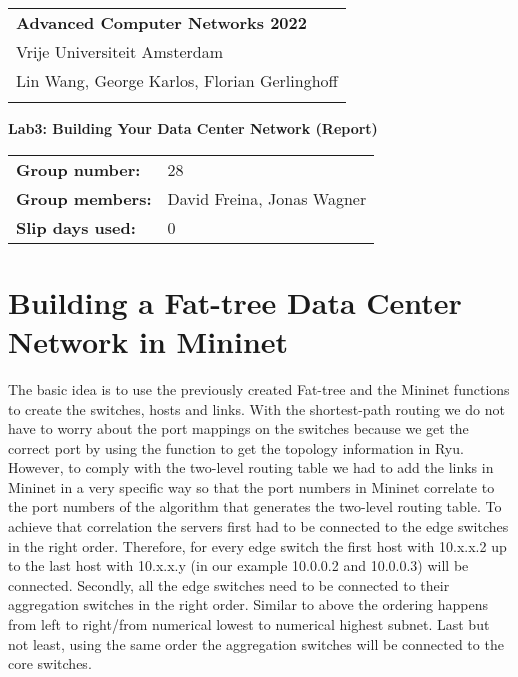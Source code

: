 \documentclass[a4paper,11pt]{article}
\newcommand{\note}[1]{\textit{\textcolor{gray}{#1}}}
\begin{document}
\thispagestyle{empty}

\begin{tabular}{@{}p{15.5cm}}
{\bf Advanced Computer Networks 2022} \\
Vrije Universiteit Amsterdam  \\ Lin Wang, George Karlos, Florian Gerlinghoff\\
\hline
\\
\end{tabular}

\vspace*{0.3cm}

{\LARGE \bf Lab3: Building Your Data Center Network (Report)}

\vspace*{0.3cm}


\begin{tcolorbox}[sharp corners, colback=blue!5!white]
\begin{tabular}{@{}ll}
\textbf{Group number:} & 28 \\
\textbf{Group members:} & David Freina, Jonas Wagner \\
\textbf{Slip days used:} & 0 \\
\end{tabular}
\end{tcolorbox}

\vspace{0.4cm}


\section{Building a Fat-tree Data Center Network in Mininet}
\label{sec:building-fat-tree-mininet}

The basic idea is to use the previously created Fat-tree and the Mininet functions to create the switches, hosts and links.
With the shortest-path routing we do not have to worry about the port mappings on the switches because we get the correct port by using the function to get the topology information in Ryu.
However, to comply with the two-level routing table we had to add the links in Mininet in a very specific way so that the port numbers in Mininet correlate to the port numbers of the algorithm that generates the two-level routing table.
To achieve that correlation the servers first had to be connected to the edge switches  in the right order.
Therefore, for every edge switch the first host with 10.x.x.2 up to the last host with 10.x.x.y (in our example 10.0.0.2 and 10.0.0.3) will be connected.
Secondly, all the edge switches need to be connected to their aggregation switches in the right order.
Similar to above the ordering happens from left to right/from numerical lowest to numerical highest subnet.
Last but not least, using the same order the aggregation switches will be connected to the core switches.
\end{document}
